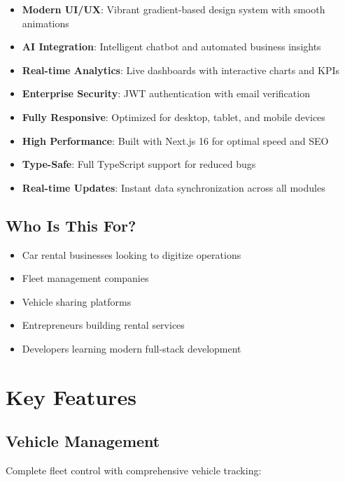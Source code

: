 \documentclass[12pt,a4paper]{article}
\begin{document}
\begin{itemize}[leftmargin=*]
    \item \textbf{Modern UI/UX}: Vibrant gradient-based design system with smooth animations
    \item \textbf{AI Integration}: Intelligent chatbot and automated business insights
    \item \textbf{Real-time Analytics}: Live dashboards with interactive charts and KPIs
    \item \textbf{Enterprise Security}: JWT authentication with email verification
    \item \textbf{Fully Responsive}: Optimized for desktop, tablet, and mobile devices
    \item \textbf{High Performance}: Built with Next.js 16 for optimal speed and SEO
    \item \textbf{Type-Safe}: Full TypeScript support for reduced bugs
    \item \textbf{Real-time Updates}: Instant data synchronization across all modules
\end{itemize}

\subsection{Who Is This For?}

\begin{itemize}[leftmargin=*]
    \item Car rental businesses looking to digitize operations
    \item Fleet management companies
    \item Vehicle sharing platforms
    \item Entrepreneurs building rental services
    \item Developers learning modern full-stack development
\end{itemize}

\section{Key Features}

\subsection{Vehicle Management}

Complete fleet control with comprehensive vehicle tracking:
\end{document}

